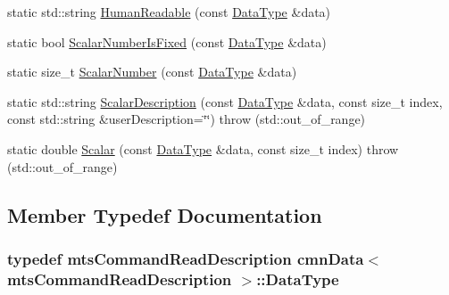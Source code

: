 \begin{DoxyCompactItemize}
\item 
static std\-::string \hyperlink{classcmn_data_3_01mts_command_read_description_01_4_a5a690fa6a4dd5b6a8af05ef5891ec364}{Human\-Readable} (const \hyperlink{classcmn_data_3_01mts_command_read_description_01_4_a1ecbaf4ae55d2af19547b13a35e88618}{Data\-Type} \&data)
\item 
static bool \hyperlink{classcmn_data_3_01mts_command_read_description_01_4_a2d1f0751885a5a54d392c0b2508cd4be}{Scalar\-Number\-Is\-Fixed} (const \hyperlink{classcmn_data_3_01mts_command_read_description_01_4_a1ecbaf4ae55d2af19547b13a35e88618}{Data\-Type} \&data)
\item 
static size\-\_\-t \hyperlink{classcmn_data_3_01mts_command_read_description_01_4_ac623d23856c3c7ab0047f18072c4c863}{Scalar\-Number} (const \hyperlink{classcmn_data_3_01mts_command_read_description_01_4_a1ecbaf4ae55d2af19547b13a35e88618}{Data\-Type} \&data)
\item 
static std\-::string \hyperlink{classcmn_data_3_01mts_command_read_description_01_4_a84383e5413525620b9f1f7bb81b79c49}{Scalar\-Description} (const \hyperlink{classcmn_data_3_01mts_command_read_description_01_4_a1ecbaf4ae55d2af19547b13a35e88618}{Data\-Type} \&data, const size\-\_\-t index, const std\-::string \&user\-Description=\char`\"{}\char`\"{})  throw (std\-::out\-\_\-of\-\_\-range)
\item 
static double \hyperlink{classcmn_data_3_01mts_command_read_description_01_4_a5e3b3855a17f8dd3890e012b7a1e3eb4}{Scalar} (const \hyperlink{classcmn_data_3_01mts_command_read_description_01_4_a1ecbaf4ae55d2af19547b13a35e88618}{Data\-Type} \&data, const size\-\_\-t index)  throw (std\-::out\-\_\-of\-\_\-range)
\end{DoxyCompactItemize}


\subsection{Member Typedef Documentation}
\hypertarget{classcmn_data_3_01mts_command_read_description_01_4_a1ecbaf4ae55d2af19547b13a35e88618}{
\subsubsection[{Data\-Type}]{\setlength{\rightskip}{0pt plus 5cm}typedef {\bf mts\-Command\-Read\-Description} {\bf cmn\-Data}$<$ {\bf mts\-Command\-Read\-Description} $>$\-::{\bf Data\-Type}}}\label{classcmn_data_3_01mts_command_read_description_01_4_a1ecbaf4ae55d2af19547b13a35e88618}


